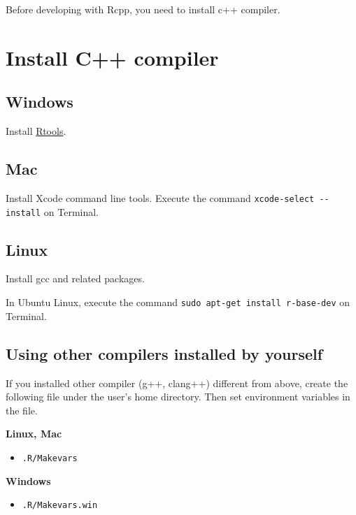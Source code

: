 \documentclass[]{book}
\providecommand{\tightlist}{%
  \setlength{\itemsep}{0pt}\setlength{\parskip}{0pt}}
\begin{document}
Before developing with Rcpp, you need to install c++ compiler.

\hypertarget{install-c-compiler}{%
\section{Install C++ compiler}\label{install-c-compiler}}

\hypertarget{windows}{%
\subsection{Windows}\label{windows}}

Install \href{https://cran.r-project.org/bin/windows/Rtools/index.html}{Rtools}.

\hypertarget{mac}{%
\subsection{Mac}\label{mac}}

Install Xcode command line tools. Execute the command \texttt{xcode-select\ -\/-install} on Terminal.

\hypertarget{linux}{%
\subsection{Linux}\label{linux}}

Install gcc and related packages.

In Ubuntu Linux, execute the command \texttt{sudo\ apt-get\ install\ r-base-dev} on Terminal.

\hypertarget{using-other-compilers-installed-by-yourself}{%
\subsection{Using other compilers installed by yourself}\label{using-other-compilers-installed-by-yourself}}

If you installed other compiler (g++, clang++) different from above, create the following file under the user's home directory. Then set environment variables in the file.

\textbf{Linux, Mac}

\begin{itemize}
\tightlist
\item
  \texttt{.R/Makevars}
\end{itemize}

\textbf{Windows}

\begin{itemize}
\tightlist
\item
  \texttt{.R/Makevars.win}
\end{itemize}
\end{document}
